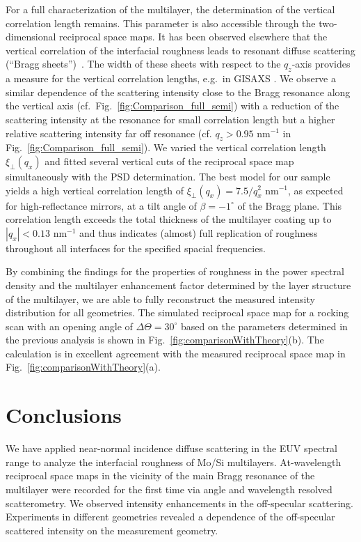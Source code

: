 For a full characterization of the multilayer, the determination of the vertical correlation length remains. This parameter is also accessible through the two-dimensional reciprocal space maps. It has been observed elsewhere that the vertical correlation of the interfacial roughness leads to resonant diffuse scattering (``Bragg sheets'')~\cite{PhysRevB.49.10668}. The width of these sheets with respect to the $q_z$-axis provides a measure for the vertical correlation lengths, e.g.~in GISAXS \cite{Siffalovic200919}. We observe a similar dependence of the scattering intensity close to the Bragg resonance along the vertical axis (cf.~Fig.~\ref{fig:Comparison_full_semi}) with a reduction of the scattering intensity at the resonance for small correlation length but a higher relative scattering intensity far off resonance (cf. $q_z>0.95$ nm$^{-1}$ in Fig.~\ref{fig:Comparison_full_semi}). We varied the vertical correlation length $\xi_\perp(q_x)$ and fitted several vertical cuts of the reciprocal space map 
simultaneously with the PSD determination. The best model for our sample yields a high vertical correlation length of $\xi_\perp(q_x)=7.5/q_x^2$ nm$^{-1}$, as expected for high-reflectance mirrors, at a tilt angle of $\beta=-1^\circ$ of the Bragg plane. 
This correlation length exceeds the total thickness of the multilayer coating up to $|q_x|<0.13$ nm$^{-1}$ and thus indicates (almost) full replication of roughness throughout all interfaces for the specified spacial frequencies.

By combining the findings for the properties of roughness in the power spectral density and the multilayer enhancement factor determined by the layer structure of the multilayer, we are able to fully reconstruct the measured intensity distribution for all geometries. The simulated reciprocal space map for a rocking scan with an opening angle of $\Delta\Theta = 30^\circ$ based on the parameters determined in the previous analysis is shown in Fig.~\ref{fig:comparisonWithTheory}(b). The calculation is in excellent agreement with the measured reciprocal space map in Fig.~\ref{fig:comparisonWithTheory}(a). 


\section{Conclusions} We have applied near-normal incidence diffuse scattering in the EUV spectral range to analyze the interfacial roughness of Mo/Si multilayers. At-wavelength reciprocal space maps in the vicinity of the main Bragg resonance of the multilayer were recorded for the first time via angle and wavelength resolved scatterometry. We observed intensity enhancements in the off-specular scattering. Experiments in different geometries revealed a dependence of the off-specular scattered intensity on the measurement geometry.

